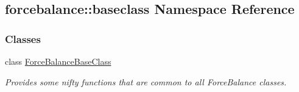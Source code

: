 \hypertarget{namespaceforcebalance_1_1baseclass}{\subsection{forcebalance\-:\-:baseclass \-Namespace \-Reference}
\label{namespaceforcebalance_1_1baseclass}
}
\subsubsection*{\-Classes}
\begin{DoxyCompactItemize}
\item 
class \hyperlink{classforcebalance_1_1baseclass_1_1ForceBalanceBaseClass}{\-Force\-Balance\-Base\-Class}
\begin{DoxyCompactList}\small\item\em \-Provides some nifty functions that are common to all \-Force\-Balance classes. \end{DoxyCompactList}\end{DoxyCompactItemize}
